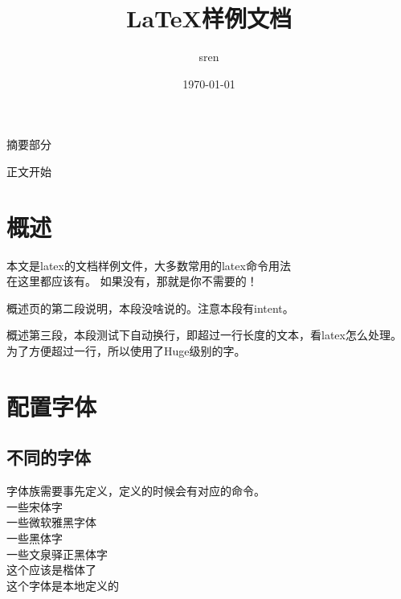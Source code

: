 \documentclass[a4paper,12pt]{article} %
\title{LaTeX样例文档}
\author{sren}
\date{\today}
\begin{document}
\maketitle
\thispagestyle{empty} %


\newpage
{}
摘要部分


\newpage
\tableofcontents                
\newpage
\listoffigures
\newpage
\listoftables


\newpage %
\pagestyle{fancy}
\newsavebox{\headpic}
\lhead{}
\rhead{}
\cfoot{}
\renewcommand{\headrulewidth}{0.4pt}
\renewcommand{\footrulewidth}{0.4pt}


 正文开始
 \section{概述}
 本文是latex的文档样例文件，大多数常用的latex命令用法\\在这里都应该有。
 如果没有，那就是你不需要的！

  概述页的第二段说明，本段没啥说的。注意本段有intent。

  {\Huge 概述第三段，本段测试下自动换行，即超过一行长度的文本，看latex怎么处理。为了方便超过一行，所以使用了Huge级别的字。}
  \pagebreak

 
 \section[pz字体]{配置字体} %
 \subsection{不同的字体}
 字体族需要事先定义，定义的时候会有对应的命令。\\
 {\song 一些宋体字}\\ %
 {\yahei 一些微软雅黑字体}\\
 {\hei 一些黑体字}\\
 {\zhei 一些文泉驿正黑体字}\\
 {\kai 这个应该是楷体了}\\
 { 这个字体是本地定义的}
\end{document}
